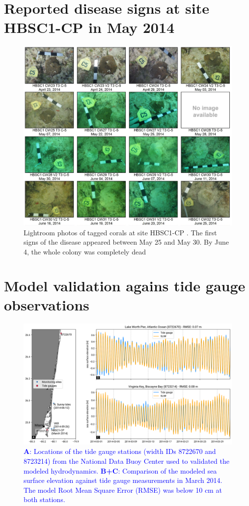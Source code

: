 \documentclass[preprint,12pt,authoryear]{elsarticle}
\newcommand{\modif}[1]{\textcolor{blue}{#1}}
\begin{document}
\section{Reported disease signs at site HBSC1-CP in May 2014}\label{onset:appendice}
\begin{figure}[h!]
	\centering
	\includegraphics[width=\textwidth]{figures/hbsc1_cp.png}
	\caption{Lightroom photos of tagged corals at site HBSC1-CP \citep{dial2017}. The first signs of the disease appeared between May 25 and May 30. By June 4, the whole colony was completely dead}
\end{figure}
\newpage
\section{Model validation agains tide gauge observations}\label{onset:validation}
\begin{figure}[h!]
    \centering
	\includegraphics[width=\textwidth]{figures/fig_validation_new.png}
    \caption{\modif{\textbf{A}: Locations of the tide gauge stations (width IDs 8722670 and 8723214) from the National Data Buoy Center used to validated the modeled hydrodynamics. \textbf{B+C}: Comparison of the modeled sea surface elevation against tide gauge measurements in March 2014. The model Root Mean Square Error (RMSE) was below 10 cm at both stations.}
}\end{figure}
\end{document}
